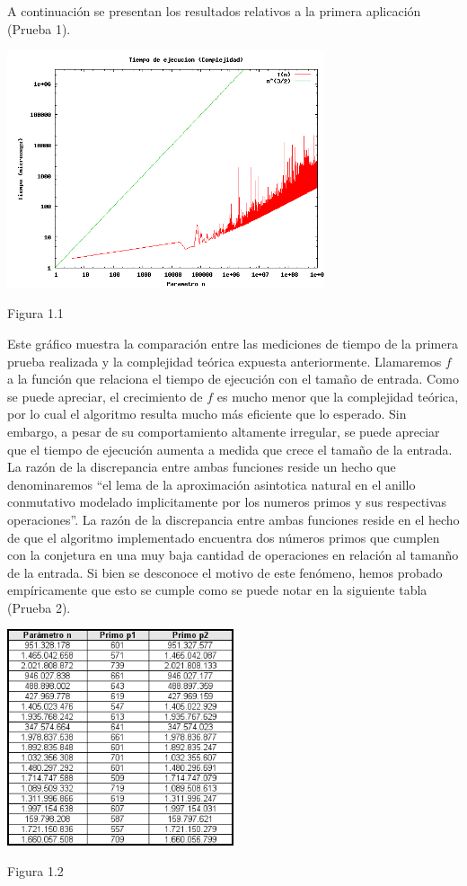 \documentclass[a4paper,10pt] {article}
\begin{document}
A continuaci\'on se presentan los resultados relativos a la primera aplicaci\'on (Prueba 1).

\begin{center}
 \includegraphics[width=0.7\textwidth]{Plots/Ej1-Complejidad.png}
\begin{center}
Figura 1.1
\end{center}
\end{center}

Este gr\'afico muestra la comparaci\'on entre las mediciones de tiempo de la primera prueba realizada y la complejidad te\'orica expuesta anteriormente. Llamaremos $f$ a la funci\'on que relaciona el tiempo de ejecuci\'on con el tama\~{n}o de entrada. Como se puede apreciar, el crecimiento de $f$ es mucho menor que la complejidad te\'orica, por lo cual el algoritmo resulta mucho m\'as eficiente que lo esperado. Sin embargo, a pesar de su comportamiento altamente irregular, se puede apreciar que el tiempo de ejecuci\'on aumenta a medida que crece el tama\~{n}o de la entrada. La raz\'on de la discrepancia entre ambas funciones reside un hecho que denominaremos ``el lema de la aproximaci\'on asintotica natural en el anillo conmutativo modelado implicitamente por los numeros primos y sus respectivas operaciones''. La raz\'on de la discrepancia entre ambas funciones reside en el hecho de que el algoritmo implementado encuentra dos n\'umeros primos que cumplen con la conjetura en una muy baja cantidad de operaciones en relaci\'on al taman\~{n}o de la entrada. Si bien se desconoce el motivo de este fen\'omeno, hemos probado emp\'iricamente que esto se cumple como se puede notar en la siguiente tabla (Prueba 2).

\begin{center}
 \includegraphics[width=0.5\textwidth]{Plots/Ej1-MayoresPrimos.png}
\begin{center}
Figura 1.2
\end{center}
\end{center}
\end{document}
